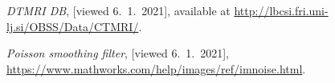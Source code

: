 \documentclass[a4paper,11pt]{article}
\begin{document}

\begin{thebibliography}{99}
    \emph{DTMRI DB}, [viewed 6.~1.~2021], available at \url{http://lbcsi.fri.uni-lj.si/OBSS/Data/CTMRI/}.
    
    \emph{Poisson smoothing filter}, [viewed 6.~1.~2021], \url{https://www.mathworks.com/help/images/ref/imnoise.html}.


\end{thebibliography}
\end{document}

